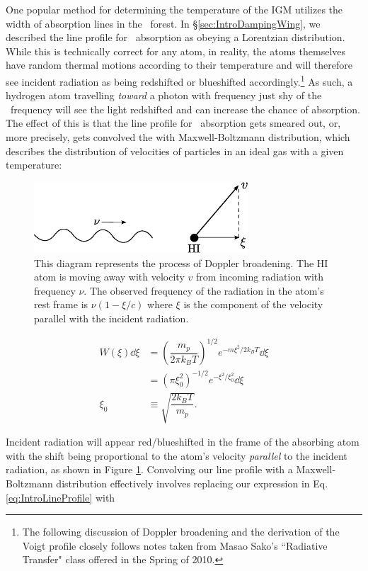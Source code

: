 One popular method for determining the temperature of the IGM utilizes the width of absorption lines in the \lya\ forest. In \S \ref{sec:IntroDampingWing}, we described the line profile for \lya\ absorption as obeying a Lorentzian distribution. While this is technically correct for any atom, in reality, the atoms themselves have random thermal motions according to their temperature and will therefore see incident radiation as being redshifted or blueshifted accordingly.\footnote{The following discussion of Doppler broadening and the derivation of the Voigt profile closely follows notes taken from Masao Sako's ``Radiative Transfer" class offered in the Spring of 2010.}  As such, a hydrogen atom travelling \textit{toward} a photon with frequency just shy of the \lya\ frequency will see the light redshifted and can increase the chance of absorption. The effect of this is that the line profile for \lya\ absorption gets smeared out, or, more precisely, gets convolved the with Maxwell-Boltzmann distribution, which describes the distribution of velocities of particles in an ideal gas with a given temperature:


\begin{figure}[h]
  \centering
  \includegraphics[width=8cm]{dopplerDiagram.eps}
  \caption{This diagram represents the process of Doppler broadening. The HI atom is moving away with velocity $v$ from incoming radiation with frequency $\nu$. The observed frequency of the radiation in the atom's rest frame is $\nu(1-\xi/c)$ where $\xi$ is the component of the velocity parallel with the incident radiation. }
  \label{fig:dopplerDiagram}
\end{figure}


\begin{align}
W(\xi)\dd \xi &= \left( \dfrac{m_p}{2\pi k_{B}T} \right)^{1/2}e^{-m\xi^2/2 k_B T}\dd \xi \\
&= \left(\pi \xi_{0}^{2} \right)^{-1/2} e^{-\xi^{2}/\xi_{0}^{2}} \dd \xi \\
\xi_{0} &\equiv \sqrt{ \dfrac{2k_B T}{m_p}}.
\end{align}

Incident radiation will appear red/blueshifted in the frame of the absorbing atom with the shift being proportional to the atom's velocity \textit{parallel} to the incident radiation, as shown in Figure \ref{fig:dopplerDiagram}. Convolving our line profile with a Maxwell-Boltzmann distribution effectively involves replacing our expression in Eq. \ref{eq:IntroLineProfile} with

